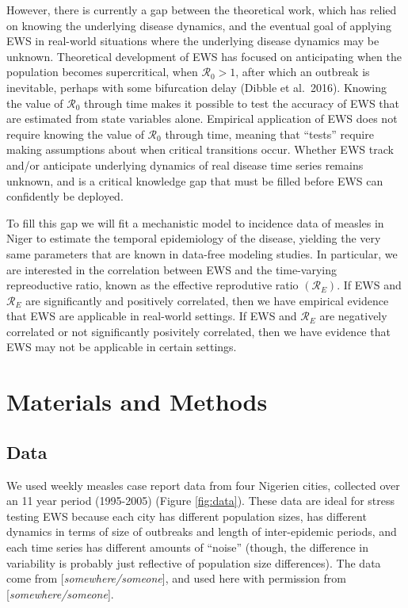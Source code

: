 \documentclass[11pt,]{article}
\begin{document}
However, there is currently a gap between the theoretical work, which
has relied on knowing the underlying disease dynamics, and the eventual
goal of applying EWS in real-world situations where the underlying
disease dynamics may be unknown. Theoretical development of EWS has
focused on anticipating when the population becomes supercritical, when
\(\mathcal{R}_0 > 1\), after which an outbreak is inevitable, perhaps
with some bifurcation delay (Dibble et al.~2016). Knowing the value of
\(\mathcal{R}_0\) through time makes it possible to test the accuracy of
EWS that are estimated from state variables alone. Empirical application
of EWS does not require knowing the value of \(\mathcal{R}_0\) through
time, meaning that ``tests'' require making assumptions about when
critical transitions occur. Whether EWS track and/or anticipate
underlying dynamics of real disease time series remains unknown, and is
a critical knowledge gap that must be filled before EWS can confidently
be deployed.

To fill this gap we will fit a mechanistic model to incidence data of
measles in Niger to estimate the temporal epidemiology of the disease,
yielding the very same parameters that are known in data-free modeling
studies. In particular, we are interested in the correlation between EWS
and the time-varying repreoductive ratio, known as the effective
reprodutive ratio \(\left(\mathcal{R}_E\right)\). If EWS and
\(\mathcal{R}_E\) are significantly and positively correlated, then we
have empirical evidence that EWS are applicable in real-world settings.
If EWS and \(\mathcal{R}_E\) are negatively correlated or not
significantly posivitely correlated, then we have evidence that EWS may
not be applicable in certain settings.

\hypertarget{materials-and-methods}{%
\section{Materials and Methods}\label{materials-and-methods}}

\hypertarget{data}{%
\subsection{Data}\label{data}}

We used weekly measles case report data from four Nigerien cities,
collected over an 11 year period (1995-2005) (Figure \ref{fig:data}).
These data are ideal for stress testing EWS because each city has
different population sizes, has different dynamics in terms of size of
outbreaks and length of inter-epidemic periods, and each time series has
different amounts of ``noise'' (though, the difference in variability is
probably just reflective of population size differences). The data come
from {[}\emph{somewhere/someone}{]}, and used here with permission from
{[}\emph{somewhere/someone}{]}.
\end{document}
